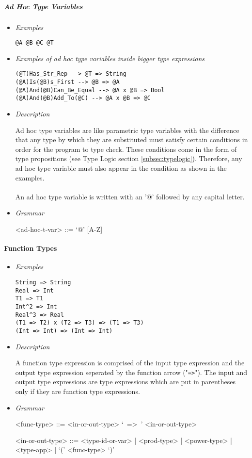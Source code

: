 \documentclass{article}
\begin{document}
\subparagraph{Ad Hoc Type Variables}

\begin{itemize}
\item \textit{Examples}
\begin{verbatim}
@A @B @C @T
\end{verbatim}

\item \textit{Examples of ad hoc type variables inside bigger type expressions}
\begin{verbatim}
(@T)Has_Str_Rep --> @T => String
(@A)Is(@B)s_First --> @B => @A
(@A)And(@B)Can_Be_Equal --> @A x @B => Bool
(@A)And(@B)Add_To(@C) --> @A x @B => @C
\end{verbatim}

\item \textit{Description}

Ad hoc type variables are like parametric type variables with the difference
that any type by which they are substituted must satisfy certain conditions in
order for the program to type check. These conditions come in the form of type
propositions (see Type Logic section \ref{subsec:typelogic}). Therefore, any ad
hoc type variable must also appear in the condition as shown in the examples.
\\\\
An ad hoc type variable is written with an '@' followed by any capital letter.

\item \textit{Grammar}
\begin{grammar}
<ad-hoc-t-var> ::= `@' [A-Z] 
\end{grammar}
\end{itemize}

\paragraph{Function Types}

\begin{itemize}
\item \textit{Examples}
\begin{verbatim}
String => String 
Real => Int
T1 => T1
Int^2 => Int
Real^3 => Real
(T1 => T2) x (T2 => T3) => (T1 => T3)
(Int => Int) => (Int => Int)
\end{verbatim}

\item \textit{Description}

A function type expression is comprised of the input type expression and the
output type expression seperated by the function arrow ("\texttt{=>}"). The
input and output type expressions are type expressions which are put in
parentheses only if they are function type expressions. 

\item \textit{Grammar}
\begin{grammar}
<func-type> ::= <in-or-out-type> `\ =>\ ' <in-or-out-type>

<in-or-out-type> ::=
<type-id-or-var> | <prod-type> | <power-type> | <type-app> | `(' <func-type> `)'
\end{grammar}
\end{itemize}
\end{document}
